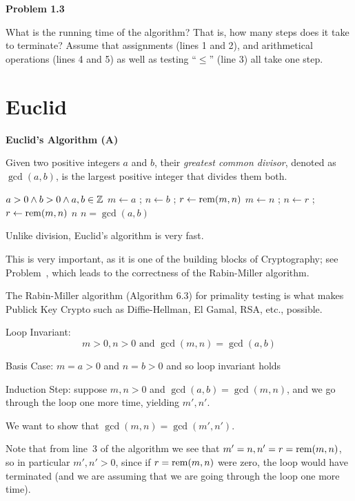 \begin{frame}

\ifthird
{\bf Problem 1.3}
\else
\fi

What is the running time of the algorithm? That is, how many steps
does it take to terminate? Assume that assignments (lines 1 and 2),
and arithmetical operations (lines 4 and 5) as well as testing
``$\le$'' (line 3) all take one step.
\end{frame}

\section{Euclid}

\begin{frame}
{\bf Euclid's Algorithm (A\fi)}

Given two positive integers $a$ and $b$, their 
{\em greatest common divisor},
denoted as $\gcd(a,b)$, is the largest positive integer
that divides them both.

\begin{algorithmic}[1]
\REQUIRE $a>0 \wedge b>0 \wedge a,b\in\mathbb{Z}$ 
\STATE $m\leftarrow a$ ; $n\leftarrow b$ ; $r\leftarrow\mathrm{rem}(m,n)$
\STATE $m\leftarrow n$ ; $n\leftarrow r$ ; $r\leftarrow\mathrm{rem}(m,n)$
\ENDWHILE
\RETURN $n$
\ENSURE $n=\gcd(a,b)$
\end{algorithmic}
\end{frame}

\begin{frame}
Unlike division, Euclid's algorithm is very fast.

This is very important, as it is one of the building blocks of
Cryptography; see Problem~\fi, %
which leads to the correctness of the
Rabin-Miller algorithm.

The Rabin-Miller algorithm (Algorithm 6.3) %
for primality testing is what makes Publick Key Crypto such as
Diffie-Hellman, El Gamal, RSA, etc., possible.
\end{frame}

\begin{frame}
Loop Invariant:
\begin{equation}\tag{1.3}
m>0,n>0\text{ and }
\gcd(m,n)=\gcd(a,b)
\end{equation}

Basis Case: $m=a>0$ and $n=b>0$ and so loop invariant holds

Induction Step: suppose $m,n>0$ and 
$\gcd(a,b)=\gcd(m,n)$, and we go
through the loop one more time, yielding $m',n'$.  

We want to show
that $\gcd(m,n)=\gcd(m',n')$.  

Note that from line~3 of the
algorithm we see that $m'=n,n'=r=\mathrm{rem}(m,n)$, so in particular
$m',n'>0$,
since if $r=\mathrm{rem}(m,n)$ were zero, the loop
would have terminated (and we are assuming that we are going through
the loop one more time). 
\end{frame}


